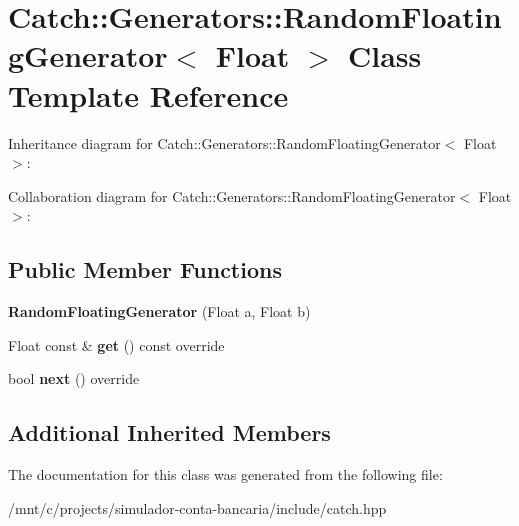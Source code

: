 \hypertarget{classCatch_1_1Generators_1_1RandomFloatingGenerator}{}\section{Catch\+:\+:Generators\+:\+:Random\+Floating\+Generator$<$ Float $>$ Class Template Reference}
\label{classCatch_1_1Generators_1_1RandomFloatingGenerator}


Inheritance diagram for Catch\+:\+:Generators\+:\+:Random\+Floating\+Generator$<$ Float $>$\+:


Collaboration diagram for Catch\+:\+:Generators\+:\+:Random\+Floating\+Generator$<$ Float $>$\+:
\subsection*{Public Member Functions}
\begin{DoxyCompactItemize}
\item 
\mbox{\label{classCatch_1_1Generators_1_1RandomFloatingGenerator_abce275ce88f7c3465addd7a98b6c408d}} 
{\bfseries Random\+Floating\+Generator} (Float a, Float b)
\item 
\mbox{\label{classCatch_1_1Generators_1_1RandomFloatingGenerator_a0dea6fa1f9e2647df022f0b588cf0a8f}} 
Float const  \& {\bfseries get} () const override
\item 
\mbox{\label{classCatch_1_1Generators_1_1RandomFloatingGenerator_a6a65e5f16abd884f58c31581b2a0d6db}} 
bool {\bfseries next} () override
\end{DoxyCompactItemize}
\subsection*{Additional Inherited Members}


The documentation for this class was generated from the following file\+:\begin{DoxyCompactItemize}
\item 
/mnt/c/projects/simulador-\/conta-\/bancaria/include/catch.\+hpp\end{DoxyCompactItemize}
